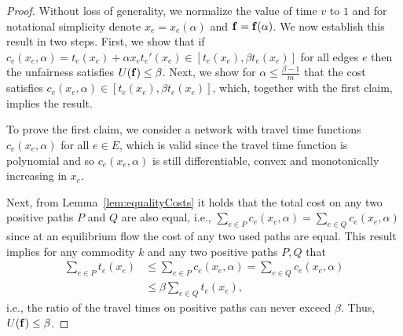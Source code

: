 \documentclass{article}
\newif\ifarxiv   %
\begin{document}
\begin{proof}
Without loss of generality, we normalize the value of time $v$ to $1$ and for notational simplicity denote $x_e = x_e(\alpha)$ and $\mathbf{f} = \mathbf{f}(\alpha)$. We now establish this result in two steps. %
First, we show that if $c_e(x_e, \alpha) = t_e(x_e) + \alpha x_e t_e'(x_e) \in [t_e(x_e), \beta t_e(x_e)]$ for all edges $e$ then the unfairness satisfies $U(\mathbf{f}) \leq \beta$. Next, we show for $\alpha \leq \frac{\beta - 1}{m}$ that the cost satisfies $c_e(x_e, \alpha) \in [t_e(x_e), \beta t_e(x_e)]$, which, together with the first claim, implies the result.

To prove the first claim, we consider a network with travel time functions $c_e(x_e, \alpha)$ for all $e \in E$, which is valid since the travel time function is polynomial and so $c_e(x_e, \alpha)$ is still differentiable, convex and monotonically increasing in $x_e$. 
\begin{comment}
Next, by Observation~\ref{obs:UE-equivalency} (see Section~\ref{sec:compTractability}), I-TAP is equivalent to a UE-TAP with objective $\sum_{e \in E}\int_{0}^{x_e} c_e(y, \alpha) \dd{y}$. By the first order \ifarxiv necessary and sufficient \fi conditions of this UE-TAP, for any two positive flow paths $P, Q$, i.e., $\x_P, \x_Q>0$, between the same O-D pair, it holds that $\sum_{e \in P} c_e(x_e, \alpha) = \sum_{e \in Q} c_e(x_e, \alpha)$. %
Since $c_e(x_e, \alpha) \in [t_e(x_e), \beta t_e(x_e)]$, it follows for any two used paths $P, Q$, i.e., $\x_P, \x_Q>0$, that \ifarxiv
\begin{align*}
    \sum_{e \in P} t_e(x_e) &\leq \sum_{e \in P} c_e(x_e, \alpha) 
    = \sum_{e \in Q} c_e(x_e, \alpha) \\
    &\leq \beta \sum_{e \in Q} t_e(x_e).
\end{align*} \else
$\sum_{e \in P} t_e(x_e) \leq \beta \sum_{e \in Q} t_e(x_e),$
\fi
\end{comment}
Next, from Lemma~\ref{lem:equalityCosts} it holds that the total cost on any two positive paths $P$ and $Q$ are also equal, i.e., $\sum_{e \in P} c_e(x_e, \alpha) = \sum_{e \in Q} c_e(x_e, \alpha)$ since at an equilibrium flow the cost of any two used paths are equal. This result implies for any commodity $k$ and any two positive paths $P, Q$ that
\begin{align*}
    \sum_{e \in P} t_e(x_e) &\leq \sum_{e \in P} c_e(x_e, \alpha) 
    = \sum_{e \in Q} c_e(x_e, \alpha) \\
    &\leq \beta \sum_{e \in Q} t_e(x_e),
\end{align*}
i.e., the ratio of the travel times on positive paths can never exceed $\beta$. Thus, $U(\mathbf{f}) \leq \beta$.


\end{proof}
\end{document}
